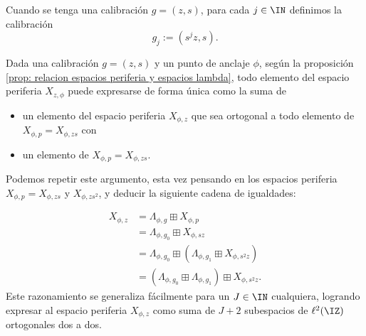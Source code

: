 \begin{comment}
Puesto que la suma de los límites de dos series convergentes 
es igual al límite de su suma,
y por el resultado establecido en la proposición
\ref{prop: descomposicion de una señal en ventanas},
tenemos que
\[
\suma{q \in \IZ}{}{\left(\suma{d=1}{s-1}{a_{q,d}\lambda_{l+qp}^{g,d}} \right)}+
\suma{q \in \IZ}{}{a_{q,0}\lambda_{l+qp}^{g,0}}
= \suma{q \in \IZ}{}{\left(\suma{d=0}{s-1}{a_{q,d}\lambda_{l+qp}^{g,d}} \right)}
= \suma{q \in \IZ }{}{y_{q}} = x;
\]
\noindent 
observe que el primer sumando, según el teorema
\ref{teo:BON para Y z,p,l}, es elemento 
de $\Lambda^{g,l}$; el segundo sumando es una 
señal constante en cada alféizar de la partición 
$\cali{A}_{1}$, por lo tanto, según el
teorema \ref{teo:caracterizacion espacios periferia},
elemento de $X_{p,l}$. 
\QEDB
\end{dem}
\end{comment}

\begin{notacion}
\label{notacion: calibracion g j}
Cuando se tenga una calibración $g=(z,s)$, 
para cada $j \in \IN$ definimos la calibración
\[
g_{j}:=(s^{j}z, s).
\]
\end{notacion}

Dada una calibración $g=(z,s)$ 
y un punto de anclaje $\phi$,
según la proposición 
\ref{prop: relacion espacios periferia y espacios lambda}, todo elemento
del espacio periferia $X_{z, \phi}$ puede expresarse
de forma única como la suma de 
\begin{itemize}
\item un elemento del espacio periferia $X_{\phi,z}$ 
que sea ortogonal a todo elemento de $X_{\phi,p}=X_{\phi, zs}$ con
\item un elemento de $X_{\phi, p}=X_{\phi, zs}$.
\end{itemize}

Podemos repetir este argumento, esta vez pensando en
los espacios periferia $X_{\phi, p}=X_{\phi, zs}$ y $X_{\phi, zs^{2}}$,
y deducir la siguiente cadena de igualdades:


\begin{align*} \label{eq7: 16Agosto}
X_{\phi, z} & = \Lambda_{\phi,g} \boxplus X_{\phi,p} \\
& = \Lambda_{\phi, g_{0}} \boxplus X_{\phi,sz} \\
& = \Lambda_{\phi, g_{0}} \boxplus (\Lambda_{\phi, g_{1}}
\boxplus X_{\phi, s^{2}z}) \\ 
& = (\Lambda_{\phi, g_{0}} \boxplus \Lambda_{\phi, g_{1}})
\boxplus X_{\phi, s^{2}z}. 
\end{align*}
Este razonamiento
se generaliza fácilmente
para un $J \in \IN$ cualquiera,
logrando expresar al
espacio periferia $X_{\phi,z}$
como suma de $J+2$ subespacios de $\ell^{2}(\IZ)$
ortogonales dos a dos.

